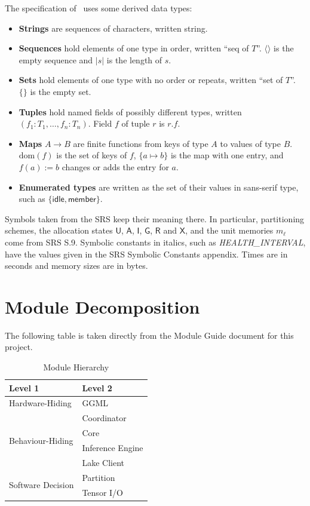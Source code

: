 \documentclass[12pt, titlepage]{article}
\begin{document}
\noindent
The specification of \progname \ uses some derived data types:
\begin{itemize}
  \item \textbf{Strings} are sequences of characters, written string.
  \item \textbf{Sequences} hold elements of one type in order, written
    ``seq of $T$''. $\langle\rangle$ is the empty sequence and $|s|$ is the
    length of $s$.
  \item \textbf{Sets} hold elements of one type with no order or repeats,
    written ``set of $T$''. $\{\}$ is the empty set.
  \item \textbf{Tuples} hold named fields of possibly different types, written
    $(f_1: T_1, \dots, f_n: T_n)$. Field $f$ of tuple $r$ is $r.f$.
  \item \textbf{Maps} $A \to B$ are finite functions from keys of type $A$ to
    values of type $B$. $\mathrm{dom}(f)$ is the set of keys of $f$,
    $\{a \mapsto b\}$ is the map with one entry, and $f(a) := b$ changes or adds
    the entry for $a$.
  \item \textbf{Enumerated types} are written as the set of their values in
    sans-serif type, such as $\{\mathsf{idle}, \mathsf{member}\}$.
\end{itemize}

\noindent
Symbols taken from the SRS keep their meaning there. In particular,
partitioning schemes, the allocation states $\mathsf{U}$, $\mathsf{A}$,
$\mathsf{I}$, $\mathsf{G}$, $\mathsf{R}$ and $\mathsf{X}$, and the unit
memories $m_\ell$ come from SRS S.9. Symbolic constants in italics, such as
\textit{HEALTH\_INTERVAL}, have the values given in the SRS Symbolic Constants
appendix. Times are in seconds and memory sizes are in bytes.

\section{Module Decomposition}

The following table is taken directly from the Module Guide document for this project.

\begin{table}[h!]
\centering
\begin{tabular}{p{} p{}}
\toprule
\textbf{Level 1} & \textbf{Level 2}\\
\midrule

{Hardware-Hiding} & GGML\\
\midrule

\multirow{4}{0.3\textwidth}{Behaviour-Hiding} & Coordinator\\
& Core\\
& Inference Engine\\
& Lake Client\\
\midrule

\multirow{2}{0.3\textwidth}{Software Decision} & Partition\\
& Tensor I/O\\
\bottomrule

\end{tabular}
\caption{Module Hierarchy}
\label{TblMH}
\end{table}
\end{document}
